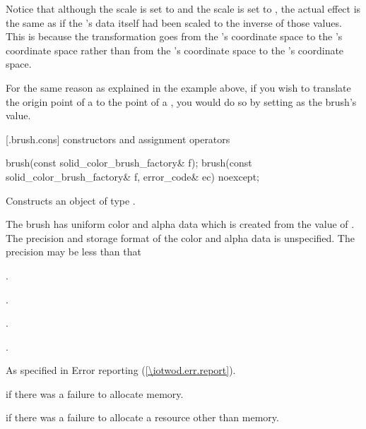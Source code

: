 \pnum
Notice that although the \xaxis scale is set to  and the \yaxis scale is set to , the actual effect is the same as if the 's data itself had been scaled to the inverse of those values. This is because the transformation goes from the 's coordinate space to the 's coordinate space rather than from the 's coordinate space to the 's coordinate space.
\exitexample

\pnum
\enternote
For the same reason as explained in the example above, if you wish to translate the origin point of a  to the point  of a , you would do so by setting  as the brush's  value.
\exitnote

 [\iotwod.brush.cons] { constructors and assignment operators}

\begin{itemdecl}
    brush(const solid_color_brush_factory& f);
    brush(const solid_color_brush_factory& f, error_code& ec) noexcept;
\end{itemdecl}
\begin{itemdescr}
	\pnum
	\effects
	Constructs an object of type .
	
	\pnum
	The brush has uniform color and alpha data which is created from the value of . The precision and storage format of the color and alpha data is unspecified. The precision may be less than that  
	
	\pnum
	\postconditions
	.
	
	.
	
	.
	
	.

	\pnum
	\throws
	As specified in Error reporting (\ref{\iotwod.err.report}).
	
	\pnum
	\errors
	 if there was a failure to allocate memory.
	
	 if there was a failure to allocate a resource other than memory.
	
\end{itemdescr}

